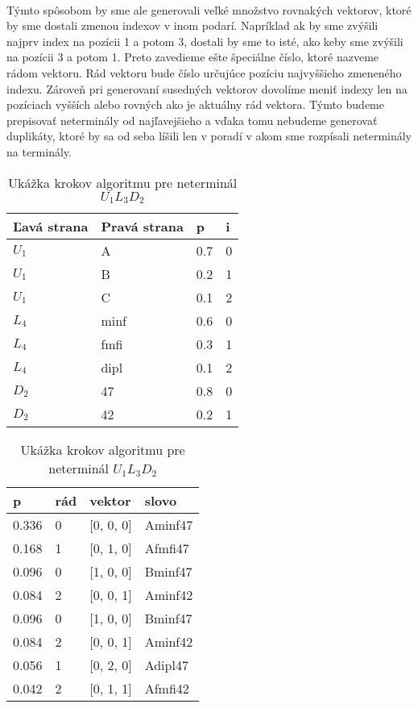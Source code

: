 \paragraph{}
Týmto spôsobom by sme ale generovali veľké množstvo rovnakých vektorov, ktoré by sme dostali zmenou indexov v inom podarí. Napríklad ak by sme zvýšili najprv index na pozícii 1 a potom 3, dostali by sme to isté, ako keby sme zvýšili na pozícii 3 a potom 1. Preto zavedieme ešte špeciálne číslo, ktoré nazveme rádom vektoru. Rád vektoru bude číslo určujúce pozíciu najvyššieho zmeneného indexu. Zároveň pri generovaní susedných vektorov dovolíme meniť indexy len na pozíciach vyšších alebo rovných ako je aktuálny rád vektora. Týmto budeme prepisovať neterminály od najľavejšieho a vďaka tomu nebudeme generovať duplikáty, ktoré by sa od seba líšili len v poradí v akom sme rozpísali neterminály na terminály.

\begin{table}[]
\centering
\caption{Ukážka krokov algoritmu pre neterminál \(U_1L_3D_2\)}
\label{postupAlgoritmu}
\begin{tabular}{l|lll}
Ľavá strana & Pravá strana & p & i \\ \hline
\(U_1\) & A & 0.7 & 0 \\
\(U_1\) & B & 0.2 & 1 \\
\(U_1\) & C & 0.1 & 2 \\
\(L_4\) & minf & 0.6 & 0 \\
\(L_4\) & fmfi & 0.3 & 1 \\
\(L_4\) & dipl & 0.1 & 2 \\
\(D_2\) & 47 & 0.8 & 0 \\
\(D_2\) & 42 & 0.2 & 1 \\
\end{tabular}
\quad
\begin{tabular}{llll}
p & rád & vektor & slovo \\ \hline
0.336 & 0 & [0, 0, 0] & Aminf47 \\ \hline \hline
0.168 & 1 & [0, 1, 0] & Afmfi47 \\
0.096 & 0 & [1, 0, 0] & Bminf47 \\
0.084 & 2 & [0, 0, 1] & Aminf42 \\ \hline \hline
0.096 & 0 & [1, 0, 0] & Bminf47 \\
0.084 & 2 & [0, 0, 1] & Aminf42 \\
0.056 & 1 & [0, 2, 0] & Adipl47 \\
0.042 & 2 & [0, 1, 1] & Afmfi42
\end{tabular}
\end{table}

